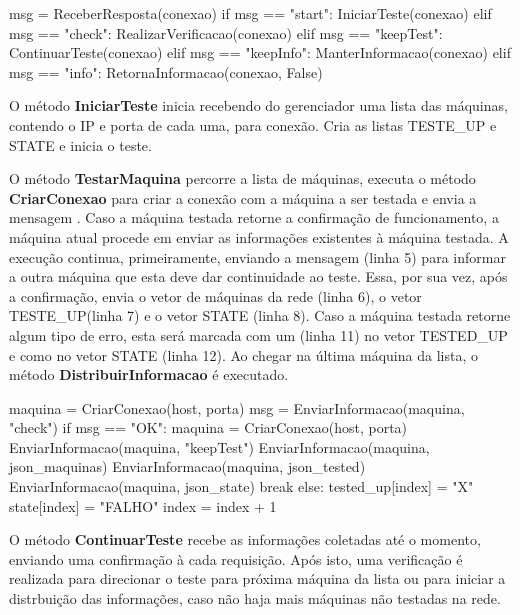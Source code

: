 \vspace*{1cm}
\begin{python}
    msg = ReceberResposta(conexao)
    if msg == "start":
        IniciarTeste(conexao)
    elif msg == "check":
        RealizarVerificacao(conexao)
    elif msg == "keepTest":
        ContinuarTeste(conexao)
    elif msg == "keepInfo":
        ManterInformacao(conexao)
    elif msg == "info":
        RetornaInformacao(conexao, False)
\end{python}
\vspace*{1cm}

O método \textbf{IniciarTeste} inicia recebendo do gerenciador uma lista das máquinas, contendo o IP e porta de cada uma, para conexão. Cria as listas TESTE\_UP e STATE e inicia o teste.

O método \textbf{TestarMaquina} percorre a lista de máquinas, executa o método \textbf{CriarConexao} para criar a conexão com a máquina a ser testada e envia a mensagem \textbf{}. Caso 
a máquina testada retorne a confirmação de funcionamento, a máquina atual procede em enviar as informações existentes à máquina testada. A execução continua, primeiramente, enviando a mensagem \textbf{} (linha 5)
para informar a outra máquina que esta deve dar continuidade ao teste. Essa, por sua vez, após a confirmação, envia o vetor de máquinas da rede (linha 6), o vetor TESTE\_UP(linha 7) e o vetor STATE (linha 8).
Caso a máquina testada retorne algum tipo de erro, esta será marcada com um  (linha 11) no vetor TESTED\_UP e como  no vetor STATE (linha 12). Ao chegar na última máquina da lista, o método \textbf{DistribuirInformacao} é executado.

\vspace*{1cm}
\begin{python}
    maquina = CriarConexao(host, porta)
    msg = EnviarInformacao(maquina, "check")
    if msg == "OK":
        maquina = CriarConexao(host, porta)
        EnviarInformacao(maquina, "keepTest")
        EnviarInformacao(maquina, json_maquinas)
        EnviarInformacao(maquina, json_tested)
        EnviarInformacao(maquina, json_state)
        break
    else:
        tested_up[index] = "X"
        state[index] = "FALHO"
        index = index + 1
\end{python}
\vspace*{1cm}

O método \textbf{ContinuarTeste} recebe as informações coletadas até o momento, enviando uma confirmação à cada requisição. Após isto, uma verificação é realizada para direcionar 
o teste para próxima máquina da lista ou para iniciar a distrbuição das informações, caso não haja mais máquinas não testadas na rede.

